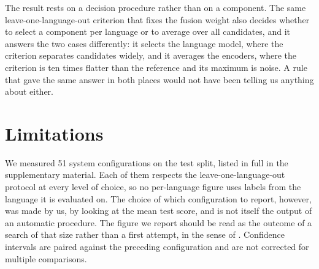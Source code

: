The result rests on a decision procedure rather than on a component. The
same leave-one-language-out criterion that fixes the fusion weight also
decides whether to select a component per language or to average over
all candidates, and it answers the two cases differently: it selects the
language model, where the criterion separates candidates widely, and it
averages the encoders, where the criterion is ten times flatter than the
reference and its maximum is noise. A rule that gave the same answer in
both places would not have been telling us anything about either.

%
%
%
\section*{Limitations}

We measured 51 system configurations on the test split, listed in full
in the supplementary material. Each of them respects the
leave-one-language-out protocol at every level of choice, so no
per-language figure uses labels from the language it is evaluated on.
The choice of which configuration to report, however, was made by us,
by looking at the mean test score, and is not itself the output of an
automatic procedure. The figure we report should be read as the outcome
of a search of that size rather than a first attempt, in the sense of
\citet{gorman-bedrick-2019-need}. Confidence intervals are paired
against the preceding configuration and are not corrected for multiple
comparisons.

